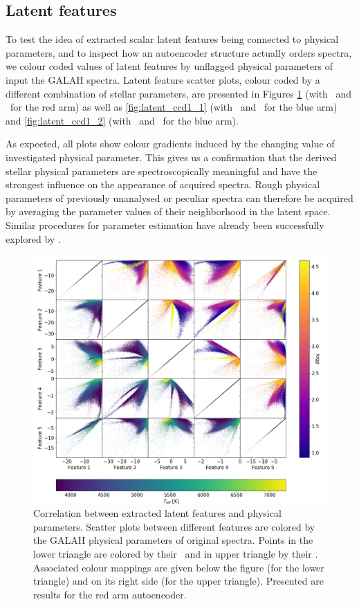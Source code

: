 \subsection{Latent features}
To test the idea of extracted scalar latent features being connected to physical parameters, and to inspect how an autoencoder structure actually orders spectra, we colour coded values of latent features by unflagged physical parameters of input the GALAH spectra. Latent feature scatter plots, colour coded by a different combination of stellar parameters, are presented in Figures \ref{fig:latent_ccd3_1} (with \Teff\ and \Logg\ for the red arm) as well as \ref{fig:latent_ccd1_1} (with \Teff\ and \Logg\ for the blue arm) and \ref{fig:latent_ccd1_2} (with \Teff\ and \Feh\ for the blue arm).

As expected, all plots show colour gradients induced by the changing value of investigated physical parameter. This gives us a confirmation that the derived stellar physical parameters are spectroscopically meaningful and have the strongest influence on the appearance of acquired spectra. Rough physical parameters of previously unanalysed or peculiar spectra can therefore be acquired by averaging the parameter values of their neighborhood in the latent space. Similar procedures for parameter estimation have already been successfully explored by \citet{2015MNRAS.452..158Y, 2017ChA&A..41..318P, 2017RAA....17...36L}.

\begin{figure}
	\centering
	\includegraphics[width=\textwidth]{encoded_features_scatter_teff_logg_ccd3.png}
	\caption{Correlation between extracted latent features and physical parameters. Scatter plots between different features are colored by the GALAH physical parameters of original spectra. Points in the lower triangle are colored by their \Teff\ and in upper triangle by their \Logg. Associated colour mappings are given below the figure (for the lower triangle) and on its right side (for the upper triangle). Presented are results for the red arm autoencoder.}
	\label{fig:latent_ccd3_1}
\end{figure}

